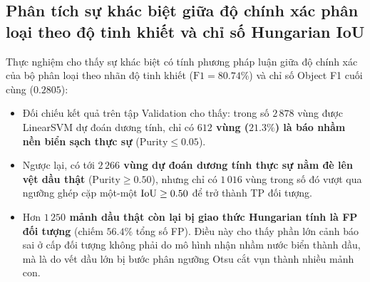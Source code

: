 \subsection{Phân tích sự khác biệt giữa độ chính xác phân loại theo độ tinh khiết và chỉ số Hungarian IoU}

Thực nghiệm cho thấy sự khác biệt có tính phương pháp luận giữa độ chính xác của bộ phân loại theo nhãn độ tinh khiết ($\text{F1} = 80.74\%$) và chỉ số Object F1 cuối cùng ($0.2805$):
\begin{itemize}
    \item Đối chiếu kết quả trên tập Validation cho thấy: trong số $2\,878$ vùng được LinearSVM dự đoán dương tính, chỉ có \textbf{$612$ vùng ($21.3\%$) là báo nhầm nền biển sạch thực sự} ($\mathrm{Purity} \le 0.05$).
    \item Ngược lại, có tới \textbf{$2\,266$ vùng dự đoán dương tính thực sự nằm đè lên vệt dầu thật} ($\mathrm{Purity} \ge 0.50$), nhưng chỉ có $1\,016$ vùng trong số đó vượt qua ngưỡng ghép cặp một-một $\mathrm{IoU} \ge 0.50$ để trở thành TP đối tượng.
    \item Hơn \textbf{$1\,250$ mảnh dầu thật còn lại bị giao thức Hungarian tính là FP đối tượng} (chiếm $56.4\%$ tổng số FP). Điều này cho thấy phần lớn cảnh báo sai ở cấp đối tượng không phải do mô hình nhận nhầm nước biển thành dầu, mà là do vết dầu lớn bị bước phân ngưỡng Otsu cắt vụn thành nhiều mảnh con.
\end{itemize}

